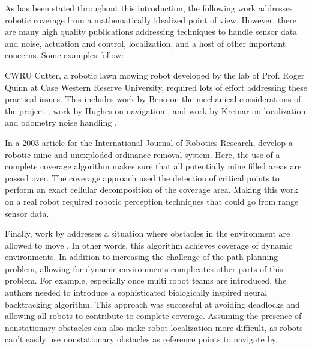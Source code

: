 As has been stated throughout this introduction, the following work addresses robotic coverage from a mathematically idealized point of view. However, there are many high quality publications addressing techniques to handle sensor data and noise, actuation and control, localization, and a host of other important concerns. Some examples follow:

CWRU Cutter, a robotic lawn mowing robot developed by the lab of Prof. Roger Quinn at Case Western Reserve University, required lots of effort addressing these practical issues. This includes work by Beno on the mechanical considerations of the project \cite{Beno}, work by Hughes on navigation \cite{Hughes}, and work by Kreinar on localization and odometry noise handling \cite{Kreinar}.

In a 2003 article for the International Journal of Robotics Research, \citeauthor{Acar} develop a robotic mine and unexploded ordinance removal system. Here, the use of a complete coverage algorithm makes sure that all potentially mine filled areas are passed over. The coverage approach used the detection of critical points to perform an exact cellular decomposition of the coverage area. Making this work on a real robot required robotic perception techniques that could go from range sensor data.

Finally, work by \citeauthor{Liu} addresses a situation where obstacles in the environment are allowed to move \cite{Liu}. In other words, this algorithm achieves coverage of dynamic environments. In addition to increasing the challenge of the path planning problem, allowing for dynamic environments complicates other parts of this problem. For example, especially once multi robot teams are introduced, the authors needed to introduce a sophisticated biologically inspired neural backtracking algorithm. This approach was successful at avoiding deadlocks and allowing all robots to contribute to complete coverage. Assuming the presence of nonstationary obstacles can also make robot localization more difficult, as robots can't easily use nonstationary obstacles as reference points to navigate by.